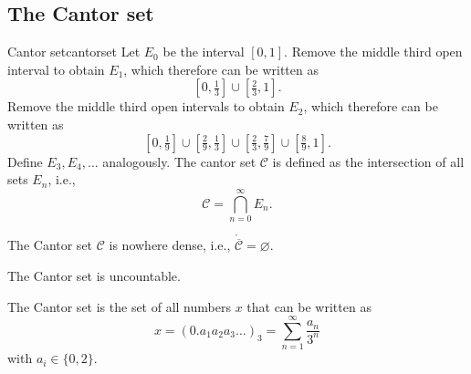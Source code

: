 
\subsection{The Cantor set}

\begin{defn}{Cantor set}{cantorset}
	Let \(E_0\) be the interval \([0, 1]\). Remove the middle third open interval to obtain \(E_1\), which therefore can be written as \[
		[0, \tfrac{1}{3}] \cup [\tfrac{2}{3}, 1].
	\]
	Remove the middle third open intervals to obtain \(E_2\), which therefore can be written as \[
		[0, \tfrac{1}{9}] \cup
		[\tfrac{2}{9}, \tfrac{1}{3}] \cup
		[\tfrac{2}{3}, \tfrac{7}{9}] \cup
		[\tfrac{8}{9}, 1].
	\]
	Define \(E_3, E_4, \dots\) analogously.
	The cantor set \(\mathcal C\) is defined as the intersection of all sets \(E_n\), i.e., \[
		\mathcal C = \bigcap_{n=0}^\infty E_n.
	\]
\end{defn}

\begin{prop}{}{}
	The Cantor set \(\mathcal C\) is nowhere dense, i.e., \(\mathring{\overline{\mathcal C}} = \varnothing\).
\end{prop}

\begin{thm}{}{}
	The Cantor set is uncountable.
\end{thm}

\begin{prop}{}{}
	The Cantor set is the set of all numbers \(x\) that can be written as \[
		x = (0.a_1a_2a_3\dots)_3 = \sum_{n = 1}^\infty \frac{a_n}{3^n}
	\]
	with \(a_i \in \{0, 2\}\).
\end{prop}

